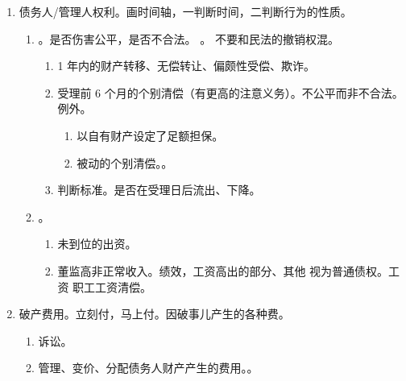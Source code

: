 \begin{enumerate}
\begin{enumerate}
\begin{enumerate}
\begin{enumerate}
                          \item 银行 \yjt 不申报 \yjt 保证人可以将来求偿权申报（不要求先还钱）。
                          \item 保证人破产。不管主债务是否到期，丧失先诉抗辩权（为时晚矣）、丧失追偿权（分配额提存）。
                        \end{enumerate}
                \end{enumerate}
        \end{enumerate}
  \item 债务人/管理人权利。画时间轴，一判断时间，二判断行为的性质。
        \begin{enumerate}
          \item {}。是否伤害公平，是否不合法。
                。
                不要和民法的撤销权混。
                \begin{enumerate}
                  \item 1 年内的财产转移、无偿转让、偏颇性受偿、欺诈。
                  \item 受理前 6 个月的个别清偿（有更高的注意义务）。不公平而非不合法。例外。
                        \begin{enumerate}
                          \item 以自有财产设定了足额担保。
                          \item 被动的个别清偿。。
                        \end{enumerate}
                  \item 判断标准。是否在受理日后流出、下降。
                \end{enumerate}
          \item {}。
                \begin{enumerate}
                  \item 未到位的出资。
                  \item 董监高非正常收入。绩效，工资高出的部分、其他 \yjt 视为普通债权。工资 \yjt 职工工资清偿。
                \end{enumerate}
        \end{enumerate}
  \item 破产费用。立刻付，马上付。因破事儿产生的各种费。
        \begin{enumerate}
          \item 诉讼。
          \item 管理、变价、分配债务人财产产生的费用。。

\end{enumerate}
\end{enumerate}
